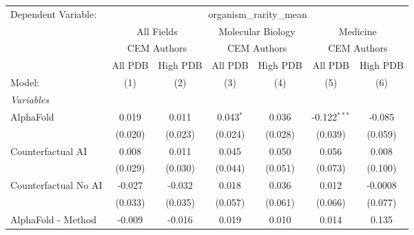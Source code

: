 \begingroup
\centering
\begin{tabular}{lcccccc}
   \tabularnewline \midrule \midrule
   Dependent Variable: & \multicolumn{6}{c}{organism\_rarity\_mean}\\
 & \multicolumn{2}{c}{All Fields} & \multicolumn{2}{c}{Molecular Biology} & \multicolumn{2}{c}{Medicine} \\
\cmidrule(lr){2-3} \cmidrule(lr){4-5} \cmidrule(lr){6-7}
 & \multicolumn{2}{c}{CEM Authors} & \multicolumn{2}{c}{CEM Authors} & \multicolumn{2}{c}{CEM Authors} \\
\cmidrule(lr){2-3} \cmidrule(lr){4-5} \cmidrule(lr){6-7}
 & \multicolumn{1}{c}{All PDB} & \multicolumn{1}{c}{High PDB} & \multicolumn{1}{c}{All PDB} & \multicolumn{1}{c}{High PDB} & \multicolumn{1}{c}{All PDB} & \multicolumn{1}{c}{High PDB} \\
\cmidrule(lr){2-2} \cmidrule(lr){3-3} \cmidrule(lr){4-4} \cmidrule(lr){5-5} \cmidrule(lr){6-6} \cmidrule(lr){7-7}
   Model:                                                     & (1)          & (2)          & (3)           & (4)          & (5)            & (6)\\  
   \midrule
   \emph{Variables}\\
   AlphaFold                                                  & 0.019        & 0.011        & 0.043$^{*}$   & 0.036        & -0.122$^{***}$ & -0.085\\   
                                                              & (0.020)      & (0.023)      & (0.024)       & (0.028)      & (0.039)        & (0.059)\\   
   Counterfactual AI                                          & 0.008        & 0.011        & 0.045         & 0.050        & 0.056          & 0.008\\   
                                                              & (0.029)      & (0.030)      & (0.044)       & (0.051)      & (0.073)        & (0.100)\\   
   Counterfactual No AI                                       & -0.027       & -0.032       & 0.018         & 0.036        & 0.012          & -0.0008\\   
                                                              & (0.033)      & (0.035)      & (0.057)       & (0.061)      & (0.066)        & (0.077)\\   
   AlphaFold - Method                                         & -0.009       & -0.016       & 0.019         & 0.010        & 0.014          & 0.135\\   

\end{tabular}
